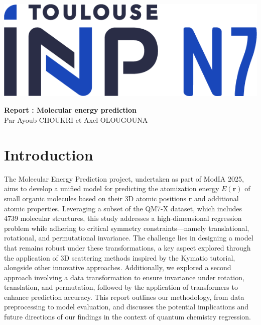 \documentclass{article}
\begin{document}
\begin{titlepage}
\begin{center}
    \includegraphics[width=0.3\linewidth]{Images_Ayoub/Logo/Logo.png}
\end{center}
    \centering
    \vspace*{3in} %
    \Huge \textbf{Report : Molecular energy prediction} \\[1cm] %
    \Large {Par Ayoub CHOUKRI et Axel OLOUGOUNA} \\ %
    \Large \date{March 2025} %
    \vfill
\end{titlepage}

\newpage

\tableofcontents

\newpage

\section*{Introduction}

The Molecular Energy Prediction project, undertaken as part of ModIA 2025, aims to develop a unified model for predicting the atomization energy \( E(\mathbf{r}) \) of small organic molecules based on their 3D atomic positions \( \mathbf{r} \) and additional atomic properties. Leveraging a subset of the QM7-X dataset, which includes 4739 molecular structures, this study addresses a high-dimensional regression problem while adhering to critical symmetry constraints—namely translational, rotational, and permutational invariance. The challenge lies in designing a model that remains robust under these transformations, a key aspect explored through the application of 3D scattering methods inspired by the Kymatio tutorial, alongside other innovative approaches. Additionally, we explored a second approach involving a data transformation to ensure invariance under rotation, translation, and permutation, followed by the application of transformers to enhance prediction accuracy. This report outlines our methodology, from data preprocessing to model evaluation, and discusses the potential implications and future directions of our findings in the context of quantum chemistry regression. \newline
\end{document}
